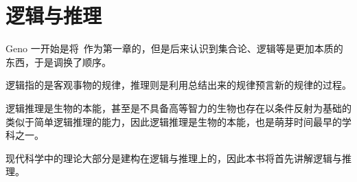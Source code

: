 \chapter{逻辑与推理}\label{ch:LogicAndInference}
    \small{Geno 一开始是将~作为第一章的，但是后来认识到集合论、逻辑等是更加本质的东西，于是调换了顺序。}

    逻辑指的是客观事物的规律，推理则是利用总结出来的规律预言新的规律的过程。

    逻辑推理是生物的本能，甚至是不具备高等智力的生物也存在以条件反射为基础的类似于简单逻辑推理的能力，因此逻辑推理是生物的本能，也是萌芽时间最早的学科之一。

    现代科学中的理论大部分是建构在逻辑与推理上的，因此本书将首先讲解逻辑与推理。
